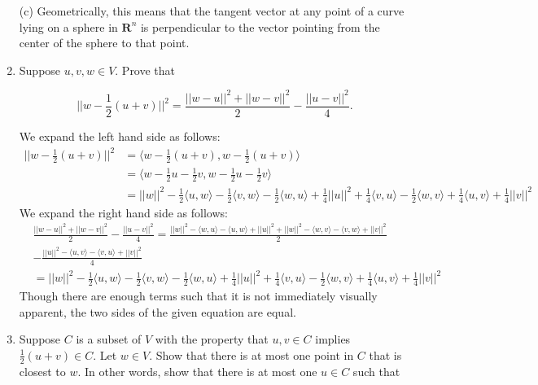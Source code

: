 \documentclass{book}
\begin{document}
\begin{enumerate}
(c) Geometrically, this means that the tangent vector at any point of a curve lying on a sphere in \(\textbf{R}^n\) is perpendicular to the vector pointing from the center of the sphere to that point.

\item Suppose \(u,v,w \in V\).  Prove that

\begin{equation*}
    ||w-\frac{1}{2}(u+v)||^2=\frac{||w-u||^2+||w-v||^2}{2}-\frac{||u-v||^2}{4}.
\end{equation*}

We expand the left hand side as follows: 
\begin{align*}
||w-\frac{1}{2}(u+v)||^2&=\langle w-\frac{1}{2}(u+v),w-\frac{1}{2}(u+v) \rangle \\
&= \langle w-\frac{1}{2}u-\frac{1}{2}v, w-\frac{1}{2}u-\frac{1}{2}v \rangle \\
&=||w||^2-\frac{1}{2}\langle u,w \rangle - \frac{1}{2}\langle v,w \rangle - \frac{1}{2}\langle w,u \rangle +\frac{1}{4}||u||^2+\frac{1}{4}\langle v,u \rangle -\frac{1}{2}\langle w,v \rangle +\frac{1}{4}\langle u,v \rangle + \frac{1}{4}||v||^2
\end{align*}
We expand the right hand side as follows:
\begin{equation*}
\begin{split}
&\frac{||w-u||^2+||w-v||^2}{2}-\frac{||u-v||^2}{4}=\frac{||w||^2-\langle w,u \rangle -\langle u,w \rangle +||u||^2+||w||^2-\langle w,v \rangle -\langle v,w \rangle +||v||^2}{2} \\
&-\frac{||u||^2-\langle u,v \rangle - \langle v,u \rangle +||v||^2}{4} \\
&= ||w||^2-\frac{1}{2}\langle u,w \rangle - \frac{1}{2}\langle v,w \rangle - \frac{1}{2}\langle w,u \rangle +\frac{1}{4}||u||^2 +\frac{1}{4}\langle v,u \rangle -\frac{1}{2}\langle w,v \rangle +\frac{1}{4}\langle u,v \rangle + \frac{1}{4}||v||^2
\end{split}
\end{equation*}
Though there are enough terms such that it is not immediately visually apparent, the two sides of the given equation are equal.

\item Suppose \(C\) is a subset of \(V\) with the property that \(u,v \in C\) implies \(\frac{1}{2}(u+v) \in C\).  Let \(w \in V\).  Show that there is at most one point in \(C\) that is closest to \(w\).  In other words, show that there is at most one \(u \in C\) such that


\end{enumerate}
\end{document}
